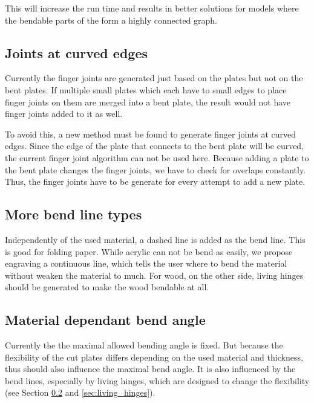 \documentclass[../ClassicThesis.tex]{subfiles}
\begin{document}
This will increase the run time and results in better solutions for models where the bendable parts of the \threedmodel{} form a highly connected graph.


\subsection{Joints at curved edges}

Currently the finger joints are generated just based on the plates but not on the bent plates. If multiple small plates which each have to small edges to place finger joints on them are merged into a bent plate, the result would not have finger joints added to it as well.

To avoid this, a new method must be found to generate finger joints at curved edges. Since the edge of the plate that connects to the bent plate  will be curved, the current finger joint algorithm can not be used here. Because adding a plate to the bent plate changes the finger joints, we have to check for overlaps constantly. Thus, the finger joints have to be generate for every attempt to add a new plate.

\subsection{More bend line types}
\label{sec:more_bend_line_types}

 Independently of the used material, a dashed line is added as the bend line. This is good for folding paper. While acrylic can not be bend as easily, we propose engraving a continuous line, which tells the user where to bend the material without weaken the material to much. For wood, on the other side, living hinges should be generated to make the wood bendable at all.

\subsection{Material dependant bend angle}
\label{sec:material_dependant_bend_angle}

Currently the the maximal allowed bending angle is fixed. But because the flexibility of the cut plates differs depending on the used material and thickness, thus should also influence the maximal bend angle. It is also influenced by the bend lines, especially by living hinges, which are designed to change the flexibility (see Section \ref{sec:more_bend_line_types} and \ref{sec:living_hinges}).
\end{document}
